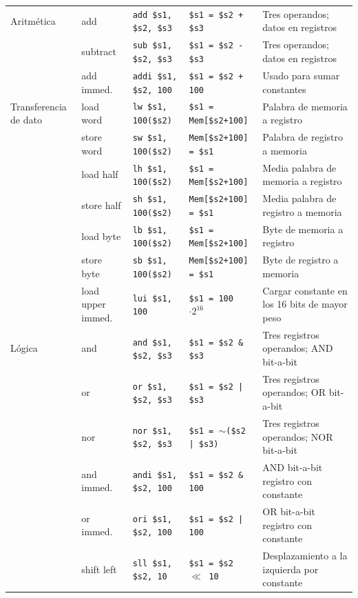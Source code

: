 \documentclass[12pt,a4paper]{article}
\begin{document}
\begin{xltabular}{\textwidth}{>{\raggedright\arraybackslash}p{2.2cm} | >{\raggedright\arraybackslash}p{2.2cm} | >{\raggedright\arraybackslash}p{3cm} | >{\raggedright\arraybackslash}p{3.5cm} X}
		Aritmética 
		& add & \texttt{add \$s1, \$s2, \$s3} & \texttt{\$s1 = \$s2 + \$s3} & Tres operandos; datos en registros \\ 
		& subtract & \texttt{sub \$s1, \$s2, \$s3} & \texttt{\$s1 = \$s2 - \$s3} & Tres operandos; datos en registros \\ 
		& add immed. & \texttt{addi \$s1, \$s2, 100} & \texttt{\$s1 = \$s2 + 100} & Usado para sumar constantes \\
		\midrule 
		Transferencia de dato 
		& load word & \texttt{lw \$s1, 100(\$s2)} & \texttt{\$s1 = Mem[\$s2+100]} & Palabra de memoria a registro \\ 
		& store word & \texttt{sw \$s1, 100(\$s2)} & \texttt{Mem[\$s2+100] = \$s1} & Palabra de registro a memoria \\ 
		& load half & \texttt{lh \$s1, 100(\$s2)} & \texttt{\$s1 = Mem[\$s2+100]} & Media palabra de memoria a registro \\ 
		& store half & \texttt{sh \$s1, 100(\$s2)} & \texttt{Mem[\$s2+100] = \$s1} & Media palabra de registro a memoria \\ 
		& load byte & \texttt{lb \$s1, 100(\$s2)} & \texttt{\$s1 = Mem[\$s2+100]} & Byte de memoria a registro \\ 
		& store byte & \texttt{sb \$s1, 100(\$s2)} & \texttt{Mem[\$s2+100] = \$s1} & Byte de registro a memoria \\ 
		& load upper immed. & \texttt{lui \$s1, 100} & \texttt{\$s1 = 100 $\cdot 2^{16}$} & Cargar constante en los 16 bits de mayor peso \\
		\midrule 
		Lógica 
		& and & \texttt{and \$s1, \$s2, \$s3} & \texttt{\$s1 = \$s2 \& \$s3} & Tres registros operandos; AND bit-a-bit \\ 
		& or & \texttt{or \$s1, \$s2, \$s3} & \texttt{\$s1 = \$s2 | \$s3} & Tres registros operandos; OR bit-a-bit \\ 
		& nor & \texttt{nor \$s1, \$s2, \$s3} & \texttt{\$s1 = $\sim$(\$s2 | \$s3)} & Tres registros operandos; NOR bit-a-bit \\ 
		& and immed. & \texttt{andi \$s1, \$s2, 100} & \texttt{\$s1 = \$s2 \& 100} & AND bit-a-bit registro con constante \\ 
		& or immed. & \texttt{ori \$s1, \$s2, 100} & \texttt{\$s1 = \$s2 | 100} & OR bit-a-bit registro con constante \\ 
		& shift left & \texttt{sll \$s1, \$s2, 10} & \texttt{\$s1 = \$s2 $\ll$ 10} & Desplazamiento a la izquierda por constante \\ 

\end{xltabular}
\end{document}

